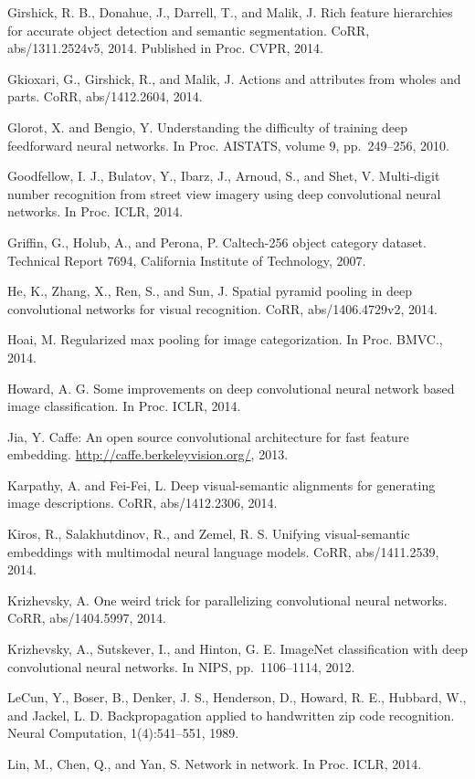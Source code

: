 \documentclass[12pt,a4paper,UTF8,twoside]{book}
\begin{document}
Girshick, R. B., Donahue, J., Darrell, T., and Malik, J. Rich feature hierarchies for accurate object detection and semantic segmentation. CoRR, abs/1311.2524v5, 2014. Published in Proc. CVPR, 2014.

Gkioxari, G., Girshick, R., and Malik, J. Actions and attributes from wholes and parts. CoRR, abs/1412.2604, 2014.

Glorot, X. and Bengio, Y. Understanding the difficulty of training deep feedforward neural networks. In Proc. AISTATS, volume 9, pp.~249--256, 2010.

Goodfellow, I. J., Bulatov, Y., Ibarz, J., Arnoud, S., and Shet, V. Multi-digit number recognition from street view imagery using deep convolutional neural networks. In Proc. ICLR, 2014.

Griffin, G., Holub, A., and Perona, P. Caltech-256 object category dataset. Technical Report 7694, California Institute of Technology, 2007.

He, K., Zhang, X., Ren, S., and Sun, J. Spatial pyramid pooling in deep convolutional networks for visual recognition. CoRR, abs/1406.4729v2, 2014.

Hoai, M. Regularized max pooling for image categorization. In Proc. BMVC., 2014.

Howard, A. G. Some improvements on deep convolutional neural network based image classification. In Proc. ICLR, 2014.

Jia, Y. Caffe: An open source convolutional architecture for fast feature embedding. \url{http://caffe.berkeleyvision.org/}, 2013.

Karpathy, A. and Fei-Fei, L. Deep visual-semantic alignments for generating image descriptions. CoRR, abs/1412.2306, 2014.

Kiros, R., Salakhutdinov, R., and Zemel, R. S. Unifying visual-semantic embeddings with multimodal neural language models. CoRR, abs/1411.2539, 2014.

Krizhevsky, A. One weird trick for parallelizing convolutional neural networks. CoRR, abs/1404.5997, 2014.

Krizhevsky, A., Sutskever, I., and Hinton, G. E. ImageNet classification with deep convolutional neural networks. In NIPS, pp.~1106--1114, 2012.

LeCun, Y., Boser, B., Denker, J. S., Henderson, D., Howard, R. E., Hubbard, W., and Jackel, L. D. Backpropagation applied to handwritten zip code recognition. Neural Computation, 1(4):541--551, 1989.

Lin, M., Chen, Q., and Yan, S. Network in network. In Proc. ICLR, 2014.
\end{document}
